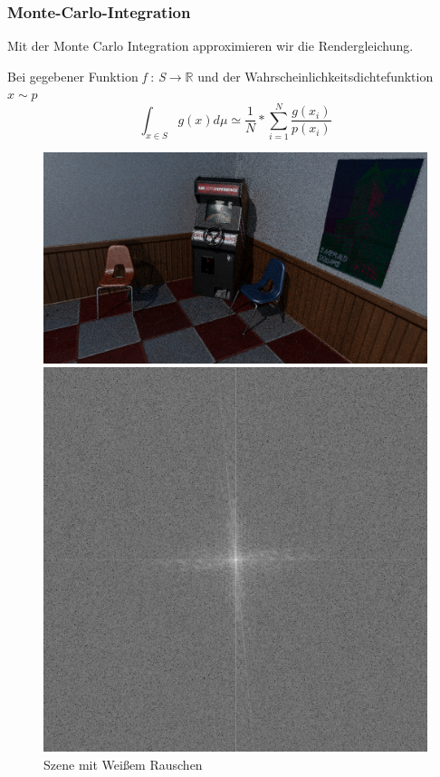 \subsubsection{Monte-Carlo-Integration}
Mit der Monte Carlo Integration approximieren wir die Rendergleichung.\par 
Bei gegebener Funktion \textit{f }:\textit{ S}$\rightarrow \mathbb{R}$ und der 
Wahrscheinlichkeitsdichtefunktion $x \sim p$
\cite{KK02}
\label{pic:MonteCarloIntegration}
\begin{equation}\label{eq:montcarlo}
    \int_{x\in S} g(x) d\mu \simeq \frac{1}{N}*\sum_{i=1}^{N}\frac{g(x_i)}{p(x_i)}
\end{equation}

\begin{figure}[H]\label{pic:WeissesRauschenTracer}
    \centering
    \begin{minipage}[t]{0.45\linewidth}
        \centering
        \includegraphics[width=\linewidth]{content/PathTracer/Bilder/WeissesRauschenSzene.png}
        \caption{Szene mit Weißem Rauschen}
    \end{minipage}
    \hfill
    \begin{minipage}[t]{0.45\linewidth}
        \centering
        \includegraphics[width=\linewidth]{content/PathTracer/Bilder/FFT_Ausschnitt2.png}

\end{minipage}
\end{figure}
